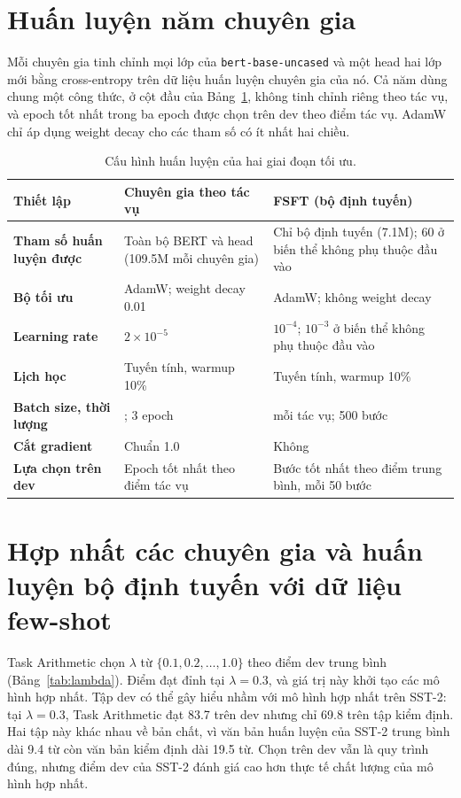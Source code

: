 \section{Huấn luyện năm chuyên gia}

Mỗi chuyên gia tinh chỉnh mọi lớp của \texttt{bert-base-uncased} và một head hai lớp mới bằng cross-entropy trên dữ liệu huấn luyện chuyên gia của nó. Cả năm dùng chung một công thức, ở cột đầu của Bảng~\ref{tab:config}, không tinh chỉnh riêng theo tác vụ, và epoch tốt nhất trong ba epoch được chọn trên dev theo điểm tác vụ. AdamW~\cite{loshchilov2019adamw} chỉ áp dụng weight decay cho các tham số có ít nhất hai chiều.

\begin{table}[htbp]
  \centering\tablestyle
  \caption{Cấu hình huấn luyện của hai giai đoạn tối ưu.}
  \label{tab:config}
  \begin{tabularx}{\linewidth}{>{\bfseries}l *{2}{>{\raggedright\arraybackslash}X}}
    \toprule
    Thiết lập & Chuyên gia theo tác vụ & FSFT (bộ định tuyến)\\
    \midrule
    Tham số huấn luyện được & Toàn bộ BERT và head (109.5M mỗi chuyên gia) & Chỉ bộ định tuyến (7.1M); 60 ở biến thể không phụ thuộc đầu vào\\
    Bộ tối ưu & AdamW; weight decay 0.01 & AdamW; không weight decay\\
    Learning rate & $2\times10^{-5}$ & $10^{-4}$; $10^{-3}$ ở biến thể không phụ thuộc đầu vào\\
    Lịch học & Tuyến tính, warmup 10\% & Tuyến tính, warmup 10\%\\
    Batch size, thời lượng & 32; 3 epoch & 16 mỗi tác vụ; 500 bước\\
    Cắt gradient & Chuẩn 1.0 & Không\\
    Lựa chọn trên dev & Epoch tốt nhất theo điểm tác vụ & Bước tốt nhất theo điểm trung bình, mỗi 50 bước\\
    \bottomrule
  \end{tabularx}
\end{table}

\section{Hợp nhất các chuyên gia và huấn luyện bộ định tuyến với dữ liệu few-shot}
\label{sec:merging}

Task Arithmetic chọn $\lambda$ từ $\{0.1,0.2,\dots,1.0\}$ theo điểm dev trung bình (Bảng~\ref{tab:lambda}). Điểm đạt đỉnh tại $\lambda=0.3$, và giá trị này khởi tạo các mô hình hợp nhất. Tập dev có thể gây hiểu nhầm với mô hình hợp nhất trên SST-2: tại $\lambda=0.3$, Task Arithmetic đạt 83.7 trên dev nhưng chỉ 69.8 trên tập kiểm định. Hai tập này khác nhau về bản chất, vì văn bản huấn luyện của SST-2 trung bình dài 9.4 từ còn văn bản kiểm định dài 19.5 từ. Chọn trên dev vẫn là quy trình đúng, nhưng điểm dev của SST-2 đánh giá cao hơn thực tế chất lượng của mô hình hợp nhất.

